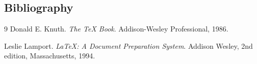 \documentclass{article}
\begin{document}
	\subsection*{Bibliography}
	\begin{thebibliography}{9}
		Donald E. Knuth.
		\emph{The \TeX{} Book}.
		Addison-Wesley Professional, 1986.
		
		Leslie Lamport.
		\emph{\LaTeX: A Document Preparation System}.
		Addison Wesley, 2nd edition, Massachusetts, 1994.
	\end{thebibliography}
	
\end{document}
